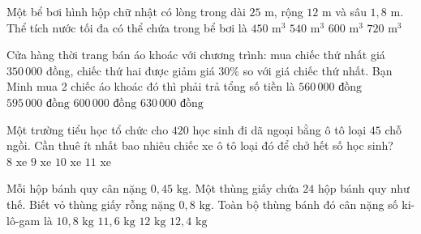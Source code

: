 \begin{ex} %
Một bể bơi hình hộp chữ nhật có lòng trong dài $25\text{ m}$, rộng $12\text{ m}$ và sâu $1{,}8\text{ m}$. Thể tích nước tối đa có thể chứa trong bể bơi là
\choice
{$450\text{ m}^3$}
{\True $540\text{ m}^3$}
{$600\text{ m}^3$}
{$720\text{ m}^3$}
\end{ex}

\begin{ex} %
Cửa hàng thời trang bán áo khoác với chương trình: mua chiếc thứ nhất giá $350\,000$ đồng, chiếc thứ hai được giảm giá $30\%$ so với giá chiếc thứ nhất. Bạn Minh mua 2 chiếc áo khoác đó thì phải trả tổng số tiền là
\choice
{$560\,000\text{ đồng}$}
{\True $595\,000\text{ đồng}$}
{$600\,000\text{ đồng}$}
{$630\,000\text{ đồng}$}
\end{ex}

\begin{ex} %
Một trường tiểu học tổ chức cho $420$ học sinh đi dã ngoại bằng ô tô loại $45$ chỗ ngồi. Cần thuê ít nhất bao nhiêu chiếc xe ô tô loại đó để chở hết số học sinh?
\choice
{$8\text{ xe}$}
{$9\text{ xe}$}
{\True $10\text{ xe}$}
{$11\text{ xe}$}
\end{ex}

\begin{ex} %
Mỗi hộp bánh quy cân nặng $0{,}45\text{ kg}$. Một thùng giấy chứa $24$ hộp bánh quy như thế. Biết vỏ thùng giấy rỗng nặng $0{,}8\text{ kg}$. Toàn bộ thùng bánh đó cân nặng số ki-lô-gam là
\choice
{$10{,}8\text{ kg}$}
{\True $11{,}6\text{ kg}$}
{$12\text{ kg}$}
{$12{,}4\text{ kg}$}
\end{ex}

